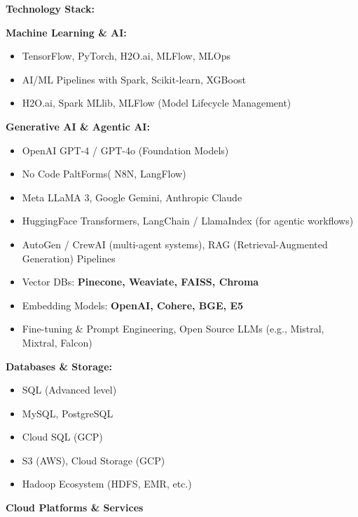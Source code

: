 \documentclass[a4paper]{article}
\begin{document}
\textbf{Technology Stack:}

\textbf{Machine Learning \& AI:}

\begin{itemize}
\item
  TensorFlow, PyTorch, H2O.ai, MLFlow, MLOps
\end{itemize}

\begin{itemize}
\item
  AI/ML Pipelines with Spark, Scikit-learn, XGBoost
\item
  H2O.ai, Spark MLlib, MLFlow (Model Lifecycle Management)
\end{itemize}

\textbf{Generative AI \& Agentic AI:}

\begin{itemize}
\item
  OpenAI GPT-4 / GPT-4o (Foundation Models)
\item
  No Code PaltForms( N8N, LangFlow)
\item
  Meta LLaMA 3, Google Gemini, Anthropic Claude
\item
  HuggingFace Transformers, LangChain / LlamaIndex (for agentic
  workflows)
\item
  AutoGen / CrewAI (multi-agent systems), RAG (Retrieval-Augmented
  Generation) Pipelines
\item
  Vector DBs: \textbf{Pinecone, Weaviate, FAISS, Chroma}
\item
  Embedding Models: \textbf{OpenAI, Cohere, BGE, E5}
\item
  Fine-tuning \& Prompt Engineering, Open Source LLMs (e.g., Mistral,
  Mixtral, Falcon)
\end{itemize}

\textbf{Databases \& Storage:}

\begin{itemize}
\item
  SQL (Advanced level)
\item
  MySQL, PostgreSQL
\item
  Cloud SQL (GCP)
\item
  S3 (AWS), Cloud Storage (GCP)
\item
  Hadoop Ecosystem (HDFS, EMR, etc.)
\end{itemize}

\textbf{Cloud Platforms \& Services}
\end{document}
